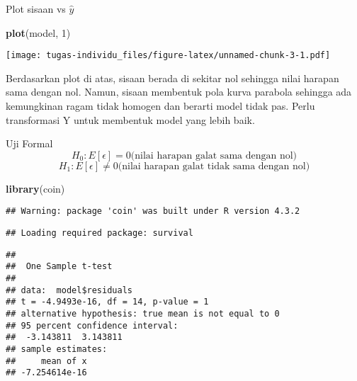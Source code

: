 \documentclass[
]{article}
\newenvironment{Shaded}{\begin{snugshade}}{\end{snugshade}}
\newcommand{\AttributeTok}[1]{\textcolor[rgb]{0.13,0.29,0.53}{#1}}
\newcommand{\DecValTok}[1]{\textcolor[rgb]{0.00,0.00,0.81}{#1}}
\newcommand{\FloatTok}[1]{\textcolor[rgb]{0.00,0.00,0.81}{#1}}
\newcommand{\FunctionTok}[1]{\textcolor[rgb]{0.13,0.29,0.53}{\textbf{#1}}}
\newcommand{\NormalTok}[1]{#1}
\newcommand{\SpecialCharTok}[1]{\textcolor[rgb]{0.81,0.36,0.00}{\textbf{#1}}}
\begin{document}
Plot sisaan vs \(\hat{y}\)

\begin{Shaded}
\begin{Highlighting}[]
\FunctionTok{plot}\NormalTok{(model, }\DecValTok{1}\NormalTok{)}
\end{Highlighting}
\end{Shaded}

\texttt{[image: tugas-individu\_files/figure-latex/unnamed-chunk-3-1.pdf]}

Berdasarkan plot di atas, sisaan berada di sekitar nol sehingga nilai
harapan sama dengan nol. Namun, sisaan membentuk pola kurva parabola
sehingga ada kemungkinan ragam tidak homogen dan berarti model tidak
pas. Perlu transformasi Y untuk membentuk model yang lebih baik.

Uji Formal
\[H_0: E[\epsilon] = 0 \text{(nilai harapan galat sama dengan nol)}\]
\[H_1: E[\epsilon] \neq 0 \text{(nilai harapan galat tidak sama dengan nol)}\]

\begin{Shaded}
\begin{Highlighting}[]
\FunctionTok{library}\NormalTok{(coin)}
\end{Highlighting}
\end{Shaded}

\begin{verbatim}
## Warning: package 'coin' was built under R version 4.3.2
\end{verbatim}

\begin{verbatim}
## Loading required package: survival
\end{verbatim}

\begin{Shaded}
\end{Shaded}

\begin{verbatim}
## 
##  One Sample t-test
## 
## data:  model$residuals
## t = -4.9493e-16, df = 14, p-value = 1
## alternative hypothesis: true mean is not equal to 0
## 95 percent confidence interval:
##  -3.143811  3.143811
## sample estimates:
##     mean of x 
## -7.254614e-16
\end{verbatim}
\end{document}
